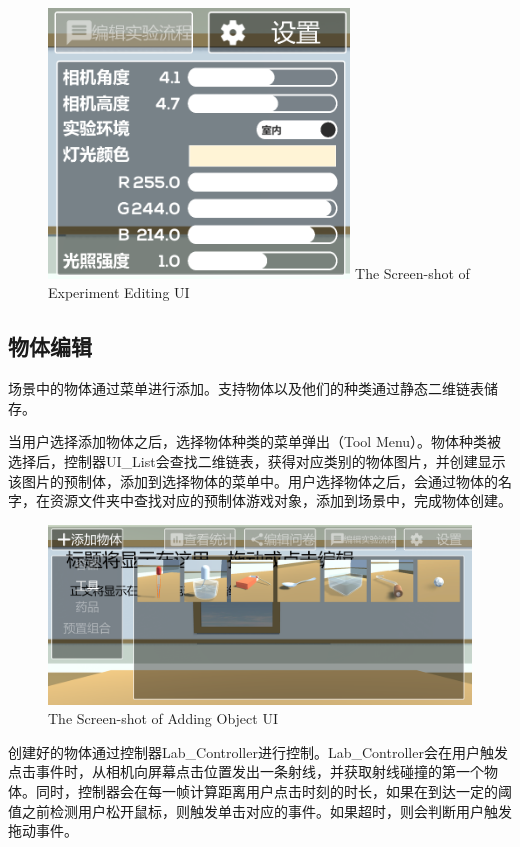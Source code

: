 \begin{figure}[!htp]
  \centering
  \includegraphics[width=8cm]{figure/settings.png}
    {The Screen-shot of Experiment Editing UI}
 \label{fig:gm}
\end{figure}

\subsection{物体编辑}
场景中的物体通过菜单进行添加。支持物体以及他们的种类通过静态二维链表储存。

	当用户选择添加物体之后，选择物体种类的菜单弹出（Tool Menu）。物体种类被选择后，控制器UI\_List会查找二维链表，获得对应类别的物体图片，并创建显示该图片的预制体，添加到选择物体的菜单中。用户选择物体之后，会通过物体的名字，在资源文件夹中查找对应的预制体游戏对象，添加到场景中，完成物体创建。
	
\begin{figure}[!htp]
  \centering
  \includegraphics[width=12cm]{figure/addObj.png}
    {The Screen-shot of Adding Object UI}
 \label{fig:gm}
\end{figure}

	创建好的物体通过控制器Lab\_Controller进行控制。Lab\_Controller会在用户触发点击事件时，从相机向屏幕点击位置发出一条射线，并获取射线碰撞的第一个物体。同时，控制器会在每一帧计算距离用户点击时刻的时长，如果在到达一定的阈值之前检测用户松开鼠标，则触发单击对应的事件。如果超时，则会判断用户触发拖动事件。

